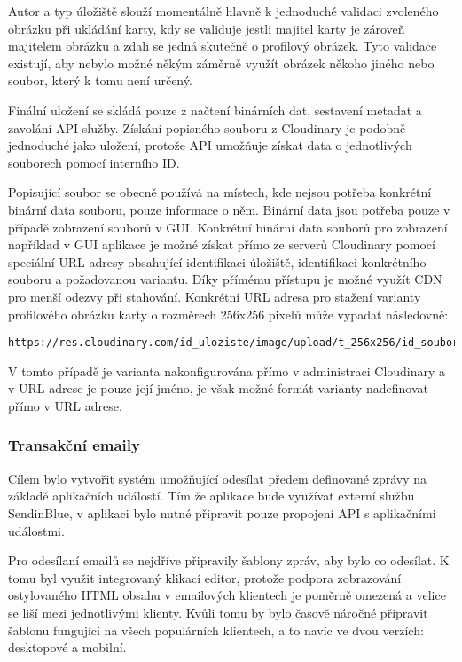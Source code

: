 		Autor a typ úložiště slouží momentálně hlavně k jednoduché validaci zvoleného obrázku při ukládání karty, kdy
		se validuje jestli majitel karty je zároveň majitelem obrázku a zdali se jedná skutečně o profilový obrázek.
		Tyto validace existují, aby nebylo možné někým záměrně využít obrázek někoho jiného nebo soubor, který k tomu
		není určený.

		Finální uložení se skládá pouze z načtení binárních dat, sestavení metadat a zavolání \ac{API}
		služby.
		Získání popisného souboru z Cloudinary je podobně jednoduché jako uložení, protože
		\ac{API} umožňuje získat data o jednotlivých souborech pomocí interního ID.

		Popisující soubor se obecně používá na místech, kde nejsou potřeba konkrétní binární data souboru, pouze
		informace o něm.
		Binární data jsou potřeba pouze v případě zobrazení souborů v \ac{GUI}.
		Konkrétní binární data souborů pro zobrazení například v \ac{GUI} aplikace je možné získat přímo ze serverů
		Cloudinary pomocí speciální \ac{URL} adresy obsahující identifikaci úložiště, identifikaci konkrétního souboru a
		požadovanou variantu.
		Díky přímému přístupu je možné využít \ac{CDN} pro menší odezvy při stahování.
		Konkrétní \ac{URL} adresa pro stažení varianty profilového obrázku karty o rozměrech 256x256 pixelů může
		vypadat následovně:

		\begin{lstlisting}[caption={Ukázka URL adresy souboru v Cloudinary uložišti. Zdroj: [autor]}]
https://res.cloudinary.com/id_uloziste/image/upload/t_256x256/id_souboru
		\end{lstlisting}

		V tomto případě je varianta nakonfigurována přímo v administraci Cloudinary a v \ac{URL} adrese je pouze její jméno,
		je však možné formát varianty nadefinovat přímo v \ac{URL} adrese.

		\subsubsection{Transakční emaily}

		Cílem bylo vytvořit systém umožňující odesílat předem definované zprávy na základě aplikačních událostí.
		Tím že aplikace bude využívat externí službu SendinBlue, v aplikaci bylo nutné připravit pouze propojení
		\ac{API} s aplikačními událostmi.

		Pro odesílaní emailů se nejdříve připravily šablony zpráv, aby bylo co odesílat.
		K tomu byl využit integrovaný klikací editor, protože
		podpora zobrazování ostylovaného \ac{HTML} obsahu v
		emailových klientech je poměrně omezená a velice se liší mezi jednotlivými klienty.
		Kvůli tomu by bylo časově náročné připravit šablonu fungující na všech populárních klientech, a to navíc ve dvou
		verzích: desktopové a mobilní.


